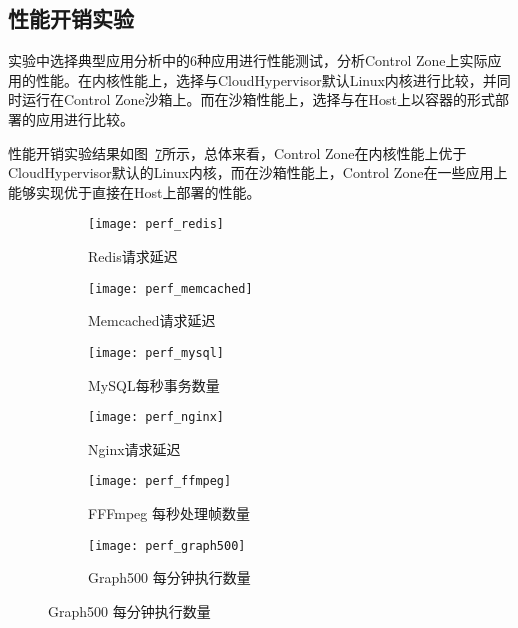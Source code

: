\subsection{性能开销实验}

实验中选择典型应用分析中的6种应用进行性能测试，分析Control Zone上实际应用的性能。在内核性能上，选择与CloudHypervisor默认Linux内核进行比较，并同时运行在Control Zone沙箱上。而在沙箱性能上，选择与在Host上以容器的形式部署的应用进行比较。

性能开销实验结果如图~\ref{fig:perf_app}所示，总体来看，Control Zone在内核性能上优于CloudHypervisor默认的Linux内核，而在沙箱性能上，Control Zone在一些应用上能够实现优于直接在Host上部署的性能。

\begin{figure}[!htbp]
    \centering
    \begin{subfigure}[b]{0.32\textwidth}
        \texttt{[image: perf\_redis]}
        \caption{\quad Redis请求延迟}
        \label{fig:perf_redis}
    \end{subfigure}
    \begin{subfigure}[b]{0.32\textwidth}
        \texttt{[image: perf\_memcached]}
        \caption{\quad Memcached请求延迟}
        \label{fig:perf_memcached}
    \end{subfigure}
    \begin{subfigure}[b]{0.32\textwidth}
        \texttt{[image: perf\_mysql]}
        \caption{\quad MySQL每秒事务数量}
        \label{fig:perf_mysql}
    \end{subfigure}
    \begin{subfigure}[b]{0.32\textwidth}
        \texttt{[image: perf\_nginx]}
        \caption{\quad Nginx请求延迟}
        \label{fig:perf_nginx}
    \end{subfigure}
    \begin{subfigure}[b]{0.32\textwidth}
        \texttt{[image: perf\_ffmpeg]}
        \caption{\quad FFFmpeg 每秒处理帧数量}
        \label{fig:perf_ffmpeg}
    \end{subfigure}
    \begin{subfigure}[b]{0.32\textwidth}
        \texttt{[image: perf\_graph500]}
        \caption{\quad Graph500 每分钟执行数量}
        \label{fig:perf_graph500}
    \end{subfigure}
\label{fig:perf_app}
\end{figure}

